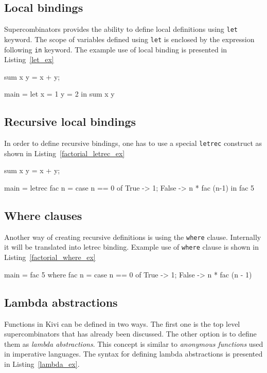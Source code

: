 \documentclass[12pt,a4paper]{report}
\begin{document}
\subsection{Local bindings}
Supercombinators provides the ability to define local definitions using
\texttt{let} keyword. The scope of variables defined using \texttt{let} is
enclosed by the expression following \texttt{in} keyword. The example use of
local binding is presented in Listing~\ref{let_ex}

\vspace*{0.2in}
\begin{code}[style=haskell,label=let_ex,caption={Local \texttt{let} binding.}]
sum x y = x + y;

main =
    let x = 1
        y = 2
    in
        sum x y
\end{code}

\subsection{Recursive local bindings}
In order to define recursive bindings, one has to use a special \texttt{letrec}
construct as shown in Listing~\ref{factorial_letrec_ex}

\vspace*{0.2in}
\begin{code}[style=haskell,label=factorial_letrec_ex,caption={Factorial function using \texttt{letrec}.}]
sum x y = x + y;

main =
    letrec fac n =
        case n == 0 of
            True  -> 1;
            False -> n * fac (n-1)
    in
        fac 5
\end{code}

\subsection{Where clauses}
Another way of creating recursive definitions is using the \texttt{where}
clause. Internally it will be translated into letrec binding. Example use of
\texttt{where} clause is shown in Listing~\ref{factorial_where_ex}

\vspace*{0.2in}
\begin{code}[style=haskell,label=factorial_where_ex,caption={Factorial function using \texttt{where}.}]
main = fac 5
    where
        fac n = case n == 0 of
            True  -> 1;
            False -> n * fac (n - 1)
\end{code}

\subsection{Lambda abstractions}
Functions in Kivi can be defined in two ways. The first one is the top level
supercombinators that has already been discussed. The other option is to define
them as \textit{lambda abstractions}. This concept is similar to \textit{anonymous
functions} used in imperative languages. The syntax for defining lambda
abstractions is presented in Listing~\ref{lambda_ex}.
\end{document}
